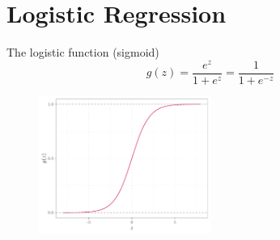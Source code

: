 \documentclass[
  9pt,
  ignorenonframetext,
  aspectratio=169,
  t, dvipsnames]{beamer}
\theoremstyle{definition}
\begin{document}
\hypertarget{logistic-regression}{%
\section{Logistic Regression}\label{logistic-regression}}

\begin{frame}{The logistic function (sigmoid)}
\protect\hypertarget{the-logistic-function-sigmoid}{}
\[g(z) = \frac{e^z}{1+e^{z}} = \frac{1}{1+e^{-z}}\]

\pause

\vspace{0.5cm}

\begin{figure}

{\centering \includegraphics[width=0.5\textwidth,height=\textheight]{CM2_Machine_Learning_files/figure-beamer/unnamed-chunk-2-1.pdf}

}

\end{figure}
\end{frame}
\end{document}
